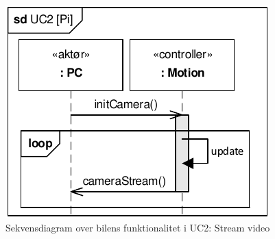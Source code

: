 \begin{figure}[h]
\centering
\includegraphics[]{../fig/diagrammer/bil/sd_uc2.pdf}
\caption{Sekvensdiagram over  bilens funktionalitet i UC2: Stream video}
\label{fig:sd_uc2_bil}
\end{figure}

